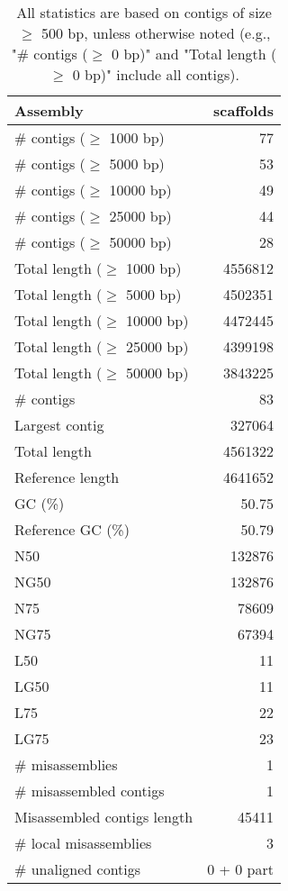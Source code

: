 \documentclass[12pt,a4paper]{article}
\begin{document}
\begin{table}[ht]
\begin{center}
\caption{All statistics are based on contigs of size $\geq$ 500 bp, unless otherwise noted (e.g., "\# contigs ($\geq$ 0 bp)" and "Total length ($\geq$ 0 bp)" include all contigs).}
\begin{tabular}{|l*{1}{|r}|}
\hline
Assembly & scaffolds \\ \hline
\# contigs ($\geq$ 1000 bp) & 77 \\ \hline
\# contigs ($\geq$ 5000 bp) & 53 \\ \hline
\# contigs ($\geq$ 10000 bp) & 49 \\ \hline
\# contigs ($\geq$ 25000 bp) & 44 \\ \hline
\# contigs ($\geq$ 50000 bp) & 28 \\ \hline
Total length ($\geq$ 1000 bp) & 4556812 \\ \hline
Total length ($\geq$ 5000 bp) & 4502351 \\ \hline
Total length ($\geq$ 10000 bp) & 4472445 \\ \hline
Total length ($\geq$ 25000 bp) & 4399198 \\ \hline
Total length ($\geq$ 50000 bp) & 3843225 \\ \hline
\# contigs & 83 \\ \hline
Largest contig & 327064 \\ \hline
Total length & 4561322 \\ \hline
Reference length & 4641652 \\ \hline
GC (\%) & 50.75 \\ \hline
Reference GC (\%) & 50.79 \\ \hline
N50 & 132876 \\ \hline
NG50 & 132876 \\ \hline
N75 & 78609 \\ \hline
NG75 & 67394 \\ \hline
L50 & 11 \\ \hline
LG50 & 11 \\ \hline
L75 & 22 \\ \hline
LG75 & 23 \\ \hline
\# misassemblies & 1 \\ \hline
\# misassembled contigs & 1 \\ \hline
Misassembled contigs length & 45411 \\ \hline
\# local misassemblies & 3 \\ \hline
\# unaligned contigs & 0 + 0 part \\ \hline

\end{tabular}
\end{center}
\end{table}
\end{document}
